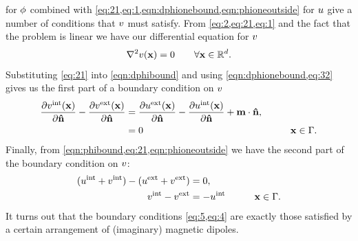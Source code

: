  for $\phi$ combined with \cref{eq:21,eq:1,eqn:dphionebound,eqn:phioneoutside} for $u$ give a number of conditions that $v$ must satisfy.
From \cref{eq:2,eq:21,eq:1} and the fact that the problem is linear we have our differential equation for $v$
\begin{equation}
  \label{eq:8}
  \nabla^2 v(\boldsymbol{\mathrm{x}}) = 0 \qquad \forall \boldsymbol{\mathrm{x}} \in {\mathbb{R}^d}.
\end{equation}
Substituting \cref{eq:21} into \cref{eqn:dphibound} and using \cref{eqn:dphionebound,eq:32} gives us the first part of a boundary condition on $v$
\begin{equation}
  \begin{aligned}
    \frac{\partial v^{\mathrm{int}}(\boldsymbol{\mathrm{x}})}{\partial \boldsymbol{\mathrm{\hat{n}}}} - \frac{\partial v^{\mathrm{ext}}(\boldsymbol{\mathrm{x}})}{\partial \boldsymbol{\mathrm{\hat{n}}}} &=
    \frac{\partial u^{\mathrm{ext}}(\boldsymbol{\mathrm{x}})}{\partial \boldsymbol{\mathrm{\hat{n}}}} - \frac{\partial u^{\mathrm{int}}(\boldsymbol{\mathrm{x}})}{\partial \boldsymbol{\mathrm{\hat{n}}}}
    + \boldsymbol{\mathrm{m}} \cdot \boldsymbol{\mathrm{\hat{n}}}, & \\
     &= 0 &\qquad \boldsymbol{\mathrm{x}} \in {\Gamma}.
    \label{eq:5}
  \end{aligned}
\end{equation}
Finally, from \cref{eqn:phibound,eq:21,eqn:phioneoutside} we have the second part of the boundary condition on $v$:
\begin{equation}
  \begin{aligned}
    (u^{\mathrm{int}} + v^{\mathrm{int}}) - (u^{\mathrm{ext}} + v^{\mathrm{ext}}) &= 0, \\
    v^{\mathrm{int}} - v^{\mathrm{ext}} &= - u^{\mathrm{int}} &\qquad \boldsymbol{\mathrm{x}} \in {\Gamma}.
    \label{eq:4}
  \end{aligned}
\end{equation}
It turns out that the boundary conditions \cref{eq:5,eq:4} are exactly those satisfied by a certain arrangement of (imaginary) magnetic dipoles.

